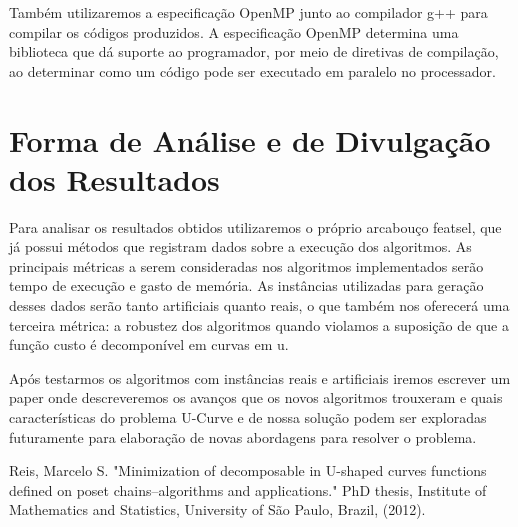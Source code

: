 \documentclass[12pt]{article}
\begin{document}
Também utilizaremos a especificação OpenMP junto ao compilador g++ para
compilar os códigos produzidos. A especificação OpenMP determina uma 
biblioteca que dá suporte ao programador, por meio de diretivas de 
compilação, ao determinar como um código pode ser executado em 
paralelo no processador.


\section{Forma de Análise e de Divulgação dos Resultados}
Para analisar os resultados obtidos utilizaremos o próprio arcabouço
featsel, que já possui métodos que registram dados sobre a execução dos
algoritmos. As principais métricas a serem consideradas nos algoritmos
implementados serão tempo de execução e gasto de memória. As instâncias
utilizadas para geração desses dados serão tanto artificiais quanto 
reais, o que também nos oferecerá uma terceira métrica: a robustez dos
algoritmos quando violamos a suposição de que a função custo é 
decomponível em curvas em u.

Após testarmos os algoritmos com instâncias reais e artificiais iremos
escrever um paper onde descreveremos os avanços que os novos algoritmos
trouxeram e quais características do problema U-Curve e de nossa solução
podem ser exploradas futuramente para elaboração de novas abordagens 
para resolver o problema.

\begin{thebibliography}{}
    Reis, Marcelo S. "Minimization of decomposable in U-shaped curves 
    functions defined on poset chains–algorithms and applications."
    PhD thesis, Institute of Mathematics and Statistics, University of
    São Paulo, Brazil, (2012).


\end{thebibliography}
\end{document}
